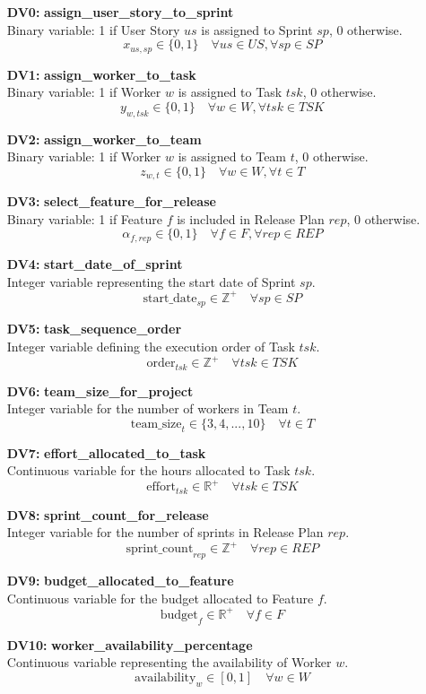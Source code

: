 \documentclass[11pt, a4paper]{article}
\begin{document}
\begin{itemize}
    \item[\textbf{DV0:}] \textbf{assign\_user\_story\_to\_sprint} \\
    Binary variable: 1 if User Story $us$ is assigned to Sprint $sp$, 0 otherwise.
    $$ x_{us, sp} \in \{0, 1\} \quad \forall us \in US, \forall sp \in SP $$
    \item[\textbf{DV1:}] \textbf{assign\_worker\_to\_task} \\
    Binary variable: 1 if Worker $w$ is assigned to Task $tsk$, 0 otherwise.
    $$ y_{w, tsk} \in \{0, 1\} \quad \forall w \in W, \forall tsk \in TSK $$
    \item[\textbf{DV2:}] \textbf{assign\_worker\_to\_team} \\
    Binary variable: 1 if Worker $w$ is assigned to Team $t$, 0 otherwise.
    $$ z_{w, t} \in \{0, 1\} \quad \forall w \in W, \forall t \in T $$
    \item[\textbf{DV3:}] \textbf{select\_feature\_for\_release} \\
    Binary variable: 1 if Feature $f$ is included in Release Plan $rep$, 0 otherwise.
    $$ \alpha_{f, rep} \in \{0, 1\} \quad \forall f \in F, \forall rep \in REP $$
    \item[\textbf{DV4:}] \textbf{start\_date\_of\_sprint} \\
    Integer variable representing the start date of Sprint $sp$.
    $$ \text{start\_date}_{sp} \in \mathbb{Z}^+ \quad \forall sp \in SP $$
    \item[\textbf{DV5:}] \textbf{task\_sequence\_order} \\
    Integer variable defining the execution order of Task $tsk$.
    $$ \text{order}_{tsk} \in \mathbb{Z}^+ \quad \forall tsk \in TSK $$
    \item[\textbf{DV6:}] \textbf{team\_size\_for\_project} \\
    Integer variable for the number of workers in Team $t$.
    $$ \text{team\_size}_{t} \in \{3, 4, ..., 10\} \quad \forall t \in T $$
    \item[\textbf{DV7:}] \textbf{effort\_allocated\_to\_task} \\
    Continuous variable for the hours allocated to Task $tsk$.
    $$ \text{effort}_{tsk} \in \mathbb{R}^+ \quad \forall tsk \in TSK $$
    \item[\textbf{DV8:}] \textbf{sprint\_count\_for\_release} \\
    Integer variable for the number of sprints in Release Plan $rep$.
    $$ \text{sprint\_count}_{rep} \in \mathbb{Z}^+ \quad \forall rep \in REP $$
    \item[\textbf{DV9:}] \textbf{budget\_allocated\_to\_feature} \\
    Continuous variable for the budget allocated to Feature $f$.
    $$ \text{budget}_{f} \in \mathbb{R}^+ \quad \forall f \in F $$
    \item[\textbf{DV10:}] \textbf{worker\_availability\_percentage} \\
    Continuous variable representing the availability of Worker $w$.
    $$ \text{availability}_{w} \in [0, 1] \quad \forall w \in W $$
\end{itemize}
\end{document}
